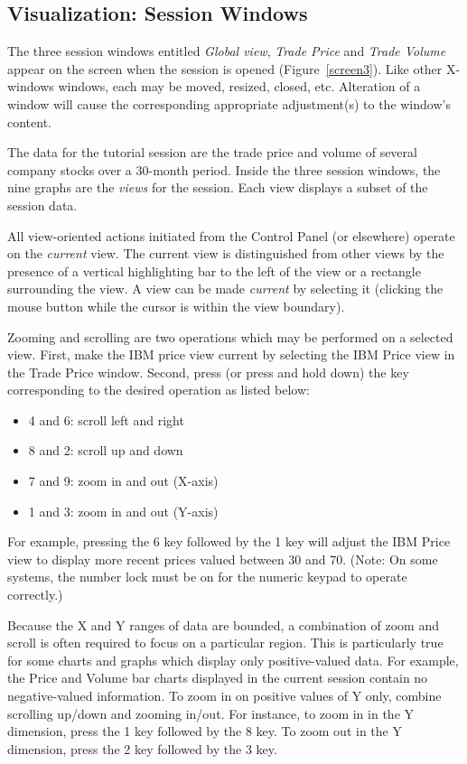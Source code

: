\subsection{Visualization: Session Windows}

The three session windows entitled {\em Global view}, {\em Trade Price} and {\em
Trade Volume} appear on the screen when the session is opened
(Figure~\ref{screen3}). Like other X-windows windows, each may be moved,
resized, closed, etc. Alteration of a window will cause the corresponding
appropriate adjustment(s) to the window's content.


The data for the tutorial session are the trade price and volume of several
company stocks over a 30-month period. Inside the three session windows, the
nine graphs are the {\em views} for the session. Each view displays a subset of
the session data.

All view-oriented actions initiated from the Control Panel (or elsewhere)
operate on the {\em current} view. The current view is distinguished from other
views by the presence of a vertical highlighting bar to the left of the view or
a rectangle surrounding the view. A view can be made {\em current} by selecting
it (clicking the mouse button while the cursor is within the view boundary).

Zooming and scrolling are two operations which may be performed on a selected
view. First, make the IBM price view current by selecting the IBM Price view in
the Trade Price window. Second, press (or press and hold down) the key
corresponding to the desired operation as listed below:

\begin{itemize}
	\item 4 and 6: scroll left and right
	\item 8 and 2: scroll up and down
	\item 7 and 9: zoom in and out (X-axis)
	\item 1 and 3: zoom in and out (Y-axis)
\end{itemize}

For example, pressing the 6 key followed by the 1 key will adjust the IBM Price
view to display more recent prices valued between 30 and 70. (Note: On some
systems, the number lock must be on for the numeric keypad to operate
correctly.)

Because the X and Y ranges of data are bounded, a combination of zoom and scroll
is often required to focus on a particular region. This is particularly true for
some charts and graphs which display only positive-valued data. For example, the
Price and Volume bar charts displayed in the current session contain no
negative-valued information. To zoom in on positive values of Y only, combine
scrolling up/down and zooming in/out. For instance, to zoom in in the Y
dimension, press the 1 key followed by the 8 key.  To zoom out in the Y
dimension, press the 2 key followed by the 3 key.

